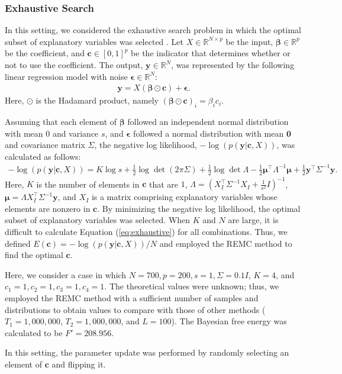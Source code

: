 \documentclass[12pt]{article}
\begin{document}
\subsubsection{Exhaustive Search}
In this setting, we considered the exhaustive search problem in which the optimal subset of explanatory variables was selected \cite{igarashi2018exhaustive}.
Let $X \in \mathbb{R}^{N \times p}$ be the input, $\boldsymbol{\beta} \in \mathbb{R}^{p}$ be the coefficient, and $\boldsymbol{c} \in [0,1]^p$ be the indicator that determines whether or not to use the coefficient.
The output, $\boldsymbol{y} \in \mathbb{R}^{N}$, was represented by the following linear regression model with noise $\boldsymbol{\epsilon} \in \mathbb{R}^{N}$:
\begin{align}
  \boldsymbol{y} = X(\boldsymbol{\beta} \odot \boldsymbol{c}) + \boldsymbol{\epsilon}.
\end{align}
Here, $\odot$ is the Hadamard product, namely $(\boldsymbol{\beta} \odot \boldsymbol{c})_i = \beta_i c_i$. \par
Assuming that each element of $\boldsymbol{\beta}$ followed an independent normal distribution with mean $0$ and variance $s$, and $\boldsymbol{\epsilon}$ followed a normal distribution with mean $\boldsymbol{0}$ and covariance matrix $\Sigma$, the negative log likelihood, $-\log(p(\boldsymbol{y}|\boldsymbol{c},X))$, was calculated as follows:
\begin{align}
  -\log(p(\boldsymbol{y}|\boldsymbol{c},X)) = K\log s + \frac{1}{2} \log\det(2\pi\Sigma) + \frac{1}{2}\log\det \Lambda - \frac{1}{2}\boldsymbol{\mu}^\top\Lambda^{-1}\boldsymbol{\mu} + \frac{1}{2}\boldsymbol{y}^\top\Sigma^{-1}\boldsymbol{y}.
  \label{eq:exhaustive}
\end{align}
Here, $K$ is the number of elements in $\boldsymbol{c}$ that are $1$, $\Lambda = (X_I^\top \Sigma^{-1} X_I + \frac{1}{s^2}I)^{-1}$, $\boldsymbol{\mu} = \Lambda X_I^\top \Sigma^{-1} \boldsymbol{y}$, and $X_I$ is a matrix comprising explanatory variables whose elements are nonzero in $\boldsymbol{c}$.
By minimizing the negative log likelihood, the optimal subset of explanatory variables was selected.
When $K$ and $N$ are large, it is difficult to calculate Equation (\ref{eq:exhaustive}) for all combinations.
Thus, we defined $E(\boldsymbol{c}) = -\log(p(\boldsymbol{y}|\boldsymbol{c},X))/N$ and employed the REMC method to find the optimal $\boldsymbol{c}$. \par
Here, we consider a case in which $N = 700, p = 200, s = 1, \Sigma = 0.1I$, $K = 4$, and $c_1 = 1, c_2 = 1, c_3 = 1, c_4 = 1$.
The theoretical values were unknown; thus, we employed the REMC method with a sufficient number of samples and distributions to obtain values to compare with those of other methods
($T_1 = 1{,}000{,}000$, $T_2 = 1{,}000{,}000$, and $L = 100$).
The Bayesian free energy was calculated to be $F' = 208.956$. \par
In this setting, the parameter update was performed by randomly selecting an element of $\boldsymbol{c}$ and flipping it. \par
\end{document}
